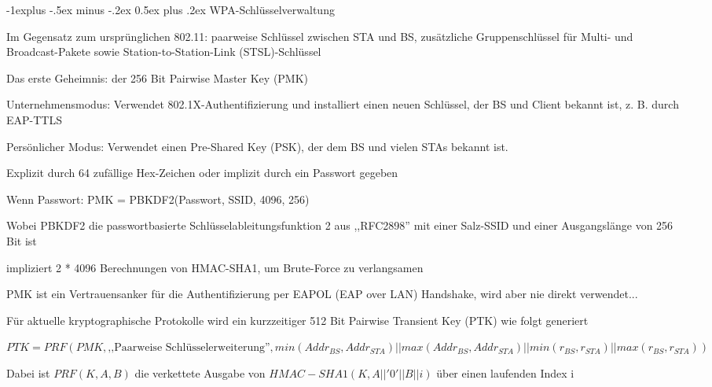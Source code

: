 \documentclass[a4paper]{article}
\makeatletter
\renewcommand{\subsection}{\@startsection{subsection}{2}{0mm}%
 {-1explus -.5ex minus -.2ex}%
 {0.5ex plus .2ex}%
 {\normalfont\normalsize\bfseries}}
\makeatother
\begin{document}
\begin{multicols}{3}
      \subsection{WPA-Schlüsselverwaltung}
      \begin{itemize*}
            \item Im Gegensatz zum ursprünglichen 802.11: paarweise Schlüssel zwischen STA und BS, zusätzliche Gruppenschlüssel für Multi- und Broadcast-Pakete sowie Station-to-Station-Link (STSL)-Schlüssel
            \item Das erste Geheimnis: der 256 Bit Pairwise Master Key (PMK)
            \begin{itemize*}
                  \item Unternehmensmodus: Verwendet 802.1X-Authentifizierung und installiert einen neuen Schlüssel, der BS und Client bekannt ist, z. B. durch EAP-TTLS
                  \item Persönlicher Modus: Verwendet einen Pre-Shared Key (PSK), der dem BS und vielen STAs bekannt ist.
                  \begin{itemize*}
                        \item Explizit durch 64 zufällige Hex-Zeichen oder implizit durch ein Passwort gegeben
                        \item Wenn Passwort: PMK = PBKDF2(Passwort, SSID, 4096, 256)
                        \item Wobei PBKDF2 die passwortbasierte Schlüsselableitungsfunktion 2 aus ,,RFC2898'' mit einer Salz-SSID und einer Ausgangslänge von 256 Bit ist
                        \item impliziert 2 * 4096 Berechnungen von HMAC-SHA1, um Brute-Force zu verlangsamen
                  \end{itemize*}
            \end{itemize*}
            \item PMK ist ein Vertrauensanker für die Authentifizierung per EAPOL (EAP over LAN) Handshake, wird aber nie direkt verwendet...
            \item Für aktuelle kryptographische Protokolle wird ein kurzzeitiger 512 Bit Pairwise Transient Key (PTK) wie folgt generiert
            \begin{itemize*}
                  \item $PTK = PRF(PMK, \text{,,Paarweise Schlüsselerweiterung''}, min(Addr_{BS}, Addr_{STA}) || max(Addr_{BS}, Addr_{STA}) || min(r_{BS}, r_{STA}) || max(r_{BS}, r_{STA}))$
                  \item Dabei ist $PRF(K, A, B)$ die verkettete Ausgabe von $HMAC-SHA1(K, A || '0' || B || i)$ über einen laufenden Index i

\end{itemize*}
\end{itemize*}
\end{multicols}
\end{document}
